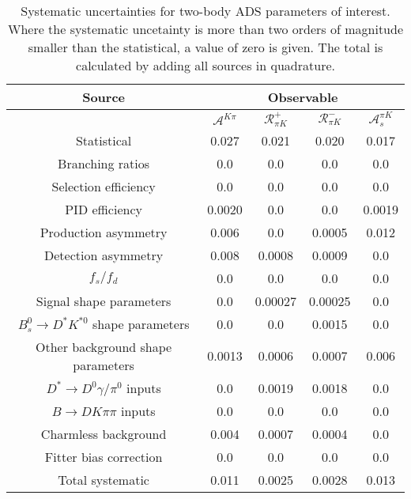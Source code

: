 \begin{sidewaystable}
  \centering
  \begin{tabular}{ccccc}
      \toprule
      Source & \multicolumn{4}{c}{Observable} \\
      \midrule
       & $\mathcal{A}^{K\pi}$ & $\mathcal{R}_{\pi K}^+$ & $\mathcal{R}_{\pi K}^-$ & $\mathcal{A}_s^{\pi K}$ \\
      \midrule
      Statistical & 0.027 & 0.021 & 0.020 & 0.017 \\
      \midrule
      Branching ratios & 0.0  & 0.0  & 0.0  & 0.0  \\
      Selection efficiency & 0.0  & 0.0  & 0.0  & 0.0  \\
      PID efficiency & 0.0020 & 0.0  & 0.0  & 0.0019 \\
      Production asymmetry & 0.006 & 0.0  & 0.0005 & 0.012 \\
      Detection asymmetry & 0.008 & 0.0008 & 0.0009 & 0.0  \\
      $f_s/f_d$ & 0.0  & 0.0  & 0.0  & 0.0  \\
      Signal shape parameters & 0.0  & 0.00027 & 0.00025 & 0.0  \\
      $B^0_s \to D^* K^{*0}$ shape parameters & 0.0  & 0.0  & 0.0015 & 0.0  \\
      Other background shape parameters & 0.0013 & 0.0006 & 0.0007 & 0.006 \\
      $D^* \to D^0 \gamma/\pi^0$ inputs & 0.0  & 0.0019 & 0.0018 & 0.0  \\
      $B\to DK\pi\pi$ inputs & 0.0  & 0.0  & 0.0  & 0.0  \\
      Charmless background & 0.004 & 0.0007 & 0.0004 & 0.0  \\
      Fitter bias correction & 0.0  & 0.0  & 0.0  & 0.0  \\
      \midrule
      Total systematic & 0.011 & 0.0025 & 0.0028 & 0.013 \\
      \bottomrule
  \end{tabular}
  \caption{Systematic uncertainties for two-body ADS parameters of interest. Where the systematic uncetainty is more than two orders of magnitude smaller than the statistical, a value of zero is given. The total is calculated by adding all sources in quadrature.}
\label{tab:twoBody_ADS_systematics}
\end{sidewaystable}
